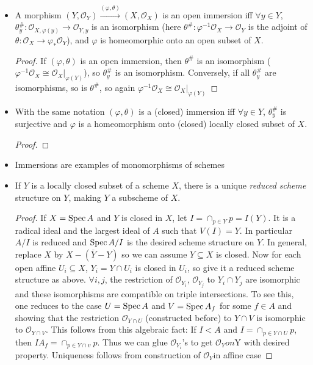 \documentclass[main]{subfiles}
\begin{document}
\begin{itemize}
\item A morphism $(Y,\mathcal O_Y)\xrightarrow{(\varphi,\theta)}(X,\mathcal O_X)$ is an open immersion iff $\forall y\in Y$, $\theta^{\#}_y:\mathcal O_{X,\varphi(y)}\to\mathcal O_{Y,y}$ is an isomorphism (here $\theta^\#:\varphi^{-1}\mathcal O_X\to\mathcal O_Y$ is the adjoint of $\theta:\mathcal O_X\to\varphi_*\mathcal O_Y$), and $\varphi$ is homeomorphic onto an open subset of $X$.
\begin{proof}
If $(\varphi,\theta)$ is an open immersion, then $\theta^\#$ is an isomorphism ($\varphi^{-1}\mathcal O_X\cong\mathcal O_X|_{\varphi(Y)}$), so $\theta^\#_y$ is an isomorphism. Conversely, if all $\theta^\#_y$ are isomorphisms, so is $\theta^\#$, so again $\varphi^{-1}\mathcal O_X\cong\mathcal O_X|_{\varphi(Y)}$
\end{proof}
\item With the same notation $(\varphi,\theta)$ is a (closed) immersion iff $\forall y\in Y$, $\theta^\#_y$ is surjective and $\varphi$ is a homeomorphism onto (closed) locally closed subset of $X$.
\begin{proof}

\end{proof}
\item Immersions are examples of monomorphisms of schemes
\item If $Y$ is a locally closed subset of a scheme $X$, there is a unique \textit{reduced scheme} structure on $Y$, making $Y$ a subscheme of $X$.
\begin{proof}
If $X=\operatorname{Spec} A$ and $Y$ is closed in $X$, let $I=\cap_{p\in Y}p=I(Y)$. It is a radical ideal and the largest ideal of $A$ such that $V(I)=Y$. In particular $A/I$ is reduced and $\operatorname{Spec} A/I$ is the desired scheme structure on $Y$. In general, replace $X$ by $X-(\overline{Y}-Y)$ so we can assume $Y\subseteq X$ is closed. Now for each open affine $U_i\subseteq X$, $Y_i=Y\cap U_i$ is closed in $U_i$, so give it a reduced scheme structure as above. $\forall i,j$, the restriction of $\mathcal O_{Y_i}$, $\mathcal O_{Y_j}$ to $Y_i\cap Y_j$ are isomorphic and these isomorphisms are compatible on triple intersections. To see this, one reduces to the case $U=\operatorname{Spec} A$ and $V=\operatorname{Spec} A_f$ for some $f\in A$ and showing that the restriction $\mathcal O_{Y\cap U}$ (constructed before) to $Y\cap V$ is isomorphic to $\mathcal O_{Y\cap V}$. This follows from this algebraic fact: If $I<A$ and $I=\cap_{p\in Y\cap U}p$, then $IA_f=\cap_{p\in Y\cap v}p$. Thus we can glue $\mathcal O_{Y_i}$'s to get $\mathcal O_Y on $Y with desired property. Uniqueness follows from construction of $\mathcal O_Y$in affine case
\end{proof}
\end{itemize}
\end{document}
